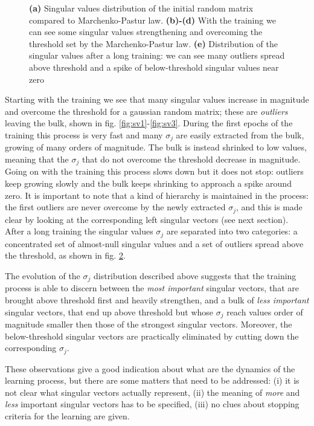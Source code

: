 \documentclass{revtex4-1}
\begin{document}
\begin{figure}
\begin{subfigure}{.5\linewidth}
    \caption{}  
    \label{fig:sv4}
  \end{subfigure}
 \caption{\textbf{(a)} Singular values distribution of the initial random matrix compared to Marchenko-Pastur law. \textbf{(b)-(d)} With the training we can see some singular values strengthening and overcoming the threshold set by the Marchenko-Pastur law. \textbf{(e)} Distribution of the singular values after a long training: we can see many outliers spread above threshold and a spike of below-threshold singular values near zero}
\end{figure}

Starting with the training we see that many singular values increase in magnitude and overcome the threshold for a gaussian random matrix; these are \textit{outliers} leaving the bulk, shown in fig. \ref{fig:sv1}-\ref{fig:sv3}. During the first epochs of the training this process is very fast and many \(\sigma_j\) are easily extracted from the bulk, growing of many orders of magnitude. The bulk is instead shrinked to low values, meaning that the \(\sigma_j\) that do not overcome the threshold decrease in magnitude. Going on with the training this process slows down but it does not stop: outliers keep growing slowly and the bulk keeps shrinking to approach a spike around zero. It is important to note that a kind of hierarchy is maintained in the process: the first outliers are never overcome by the newly extracted \(\sigma_j\), and this is made clear by looking at the corresponding left singular vectors (see next section).
After a long training the singular values \(\sigma_j\) are separated into two categories: a concentrated set of almost-null singular values and a set of outliers spread above the threshold, as shown in fig. \ref{fig:sv4}.

The evolution of the \(\sigma_j\) distribution described above suggests that the training process is able to discern between the \textit{most important} singular vectors, that are brought above threshold first and heavily strengthen, and a bulk of \textit{less important} singular vectors, that end up above threshold but whose \( \sigma_j\) reach values order of magnitude smaller then those of the strongest singular vectors. Moreover, the below-threshold singular vectors are practically eliminated by cutting down the corresponding \(\sigma_j\).

These observations give a good indication about what are the dynamics of the learning process, but there are some matters that need to be addressed: (i) it is not clear what singular vectors actually represent, (ii) the meaning of \textit{more} and \textit{less} important singular vectors has to be specified, (iii) no clues about stopping criteria for the learning are given.
\end{document}
